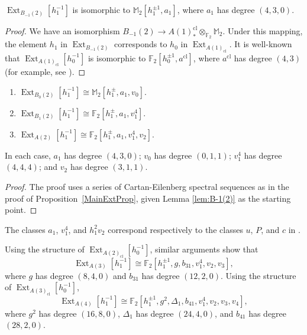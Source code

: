 \documentclass[10pt]{amsart}
\begin{document}
\begin{lemma}
\label{lem:B-1(2)}
$\operatorname{Ext}_{B_{-1}(2)}[h_1^{-1}]$ is isomorphic to ${\ensuremath{\mathbb{M}}}_2[h_1^{\pm 1},a_1]$,
where $a_1$ has degree $(4,3,0)$.
\end{lemma}

\begin{proof}
We have an isomorphism 
$B_{-1}(2) {\longrightarrow} A(1)_*^{\mathrm{cl}}\otimes_{{\ensuremath{\mathbb{F}}}_2} {\ensuremath{\mathbb{M}}}_2$.
Under this mapping, the element $h_1$ in $\operatorname{Ext}_{B_{-1}(2)}$
corresponds to
$h_0$ in $\operatorname{Ext}_{A(1)_{\mathrm{cl}}}$.
It is well-known that 
$\operatorname{Ext}_{A(1)_{\mathrm{cl}}}[h_0^{-1}]$ is isomorphic to ${\ensuremath{\mathbb{F}}}_2 [ h_0^{\pm 1}, a^{\mathrm{cl}} ]$, where $a^{\mathrm{cl}}$ has degree $(4,3)$
(for example, see \cite[Theorem 3.1.25]{R}).
\end{proof}

\begin{prop}\label{CohomBi(2)} 
\mbox{}
\begin{enumerate}
\item $\operatorname{Ext}_{B_0(2)}[h_1^{-1}]{\cong} {\ensuremath{\mathbb{M}}}_2[h_1^{\pm},a_1,v_0]$.
\item $\operatorname{Ext}_{B_1(2)}[h_1^{-1}] {\cong} {\ensuremath{\mathbb{F}}}_2[h_1^\pm,a_1,v_1^4]$.
\item  $\operatorname{Ext}_{A(2)}[h_1^{-1}]  {\cong} {\ensuremath{\mathbb{F}}}_2[h_1^\pm,a_1,v_1^4,v_2]$.
\end{enumerate}
In each case, $a_1$ has degree $(4,3,0)$;
$v_0$ has degree $(0,1,1)$;
$v_1^4$ has degree $(4,4,4)$;
and $v_2$ has degree $(3,1,1)$.
\end{prop}

\begin{proof}
The proof 
uses a series of Cartan-Eilenberg spectral sequences as in 
the proof of Proposition~\ref{MainExtProp}, given 
Lemma \ref{lem:B-1(2)} as the starting point.
\end{proof}

\begin{rmk} The classes $a_1$, $v_1^4$, and $h_1^2 v_2$ correspond respectively 
to the classes $u$, $P$, and $c$ in \cite[Theorem~4.13]{IMotA(2)}.
\end{rmk}

\begin{rmk}
Using the structure of $\operatorname{Ext}_{A(2)_{\mathrm{cl}}}[h_0^{-1}]$,
similar arguments show that
\[ 
\operatorname{Ext}_{A(3)}[h_1^{-1}] {\cong} {\ensuremath{\mathbb{F}}}_2[h_1^{\pm 1},g,b_{31},v_1^4,v_2,v_3],
\]
where $g$ has degree $(8,4,0)$ and 
$b_{31}$ has degree $(12,2,0)$.
Using the structure of $\operatorname{Ext}_{A(3)_{\mathrm{cl}}}[h_0^{-1}]$, 
\[ 
\operatorname{Ext}_{A(4)}[h_1^{-1}] {\cong} {\ensuremath{\mathbb{F}}}_2[h_1^{\pm 1},g^2,\Delta_1,b_{41},v_1^4,v_2,v_3,v_4], \]
where $g^2$ has degree $(16,8,0)$,
$\Delta_1$ has degree $(24,4,0)$, and
$b_{41}$ has degree $(28,2,0)$.
\end{rmk}
\end{document}
